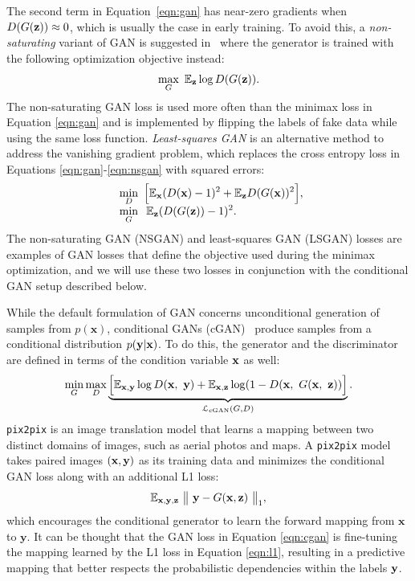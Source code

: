 The second term in Equation~\ref{eqn:gan} has near-zero gradients when $D(G(\mathbf{z})) \approx 0$, which is usually the case in early training.
To avoid this, a \textit{non-saturating} variant of GAN is suggested in~\cite{goodfellow2014gan} where the generator is trained with the following optimization objective instead:
\begin{equation}\label{eqn:nsgan}
\max_{G}~ \mathbb{E}_{\mathbf{z}} \log D(G(\mathbf{z})).
\end{equation}
The non-saturating GAN loss is used more often than the minimax loss in Equation \ref{eqn:gan} and is implemented by flipping the labels of fake data while using the same loss function.
\textit{Least-squares GAN} \cite{mao2017lsgan} is an alternative method to address the vanishing gradient problem, which replaces the cross entropy loss in Equations \ref{eqn:gan}-\ref{eqn:nsgan} with squared errors:%
\begin{equation}\label{eqn:lsgan}
	\begin{array}{l@{}l}
	\displaystyle\min_{D} ~\Big [ \E_{\x} (D(\x) - 1)^2 + \E_{\z} D(G(\x))^2 \Big ], \\
	\displaystyle\min_{G} ~\>\E_{\z} (D(G(\z)) - 1)^2.
	\end{array}
\end{equation}
The non-saturating GAN (NSGAN) and least-squares GAN (LSGAN) losses are examples of GAN losses that define the objective used during the minimax optimization, and we will use these two losses in conjunction with the conditional GAN setup described below.

While the default formulation of GAN concerns unconditional generation of samples from $p(\mathbf{x})$, conditional GANs (cGAN)~\cite{mirza2014conditional} produce samples from a conditional distribution $p(\mathbf{y}|\mathbf{x})$. To do this, the generator and the discriminator are defined in terms of                                                                                                                                                                                                                                                     the condition variable $\mathbf{x}$ as well:
\begin{equation}
\label{eqn:cgan}
\min_{G}\max_{D}\underbrace{\Big [ \mathbb{E}_{\mathbf{x},\mathbf{y}} \log D(\mathbf{x},~\mathbf{y}) + \mathbb{E}_{\mathbf{x},\mathbf{z}} \log (1 - D ( \mathbf{x},~ G(\mathbf{x},~\mathbf{z})) \Big ]}_{\mathcal{L}_{\text{cGAN}}(G, D)}.
\end{equation}
\texttt{pix2pix} \cite{isola2017pix2pix} is an image translation model that learns a mapping between two distinct domains of images, such as aerial photos and maps.
A \texttt{pix2pix} model takes paired images $(\mathbf{x}, \mathbf{y})$ as its training data and minimizes the conditional GAN loss along with an additional L1 loss:
\begin{equation}\label{eqn:l1}
\mathbb{E}_{\mathbf{x},\mathbf{y},\mathbf{z}} ~ \big \lVert ~ \mathbf{y} - G(\mathbf{x}, \mathbf{z}) ~ \big \rVert_1,
\end{equation}
which encourages the conditional generator to learn the forward mapping from $\mathbf{x}$ to $\mathbf{y}$. It can be thought that the GAN loss in Equation \ref{eqn:cgan} is fine-tuning the mapping learned by the L1 loss in Equation \ref{eqn:l1}, resulting in a predictive mapping that better respects the probabilistic dependencies within the labels $\mathbf{y}$.

